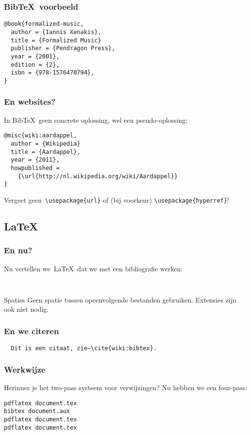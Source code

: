 \begin{frame}[fragile]
  \frametitle{Bib\TeX\ voorbeeld}

  \begin{verbatim}
@book{formalized-music,
  author = {Iannis Xenakis},
  title = {Formalized Music}
  publisher = {Pendragon Press},
  year = {2001},
  edition = {2},
  isbn = {978-1576470794},
}
  \end{verbatim}
\end{frame}

\begin{frame}[fragile]
  \frametitle{En websites?}

  In Bib\TeX\ geen concrete oplossing, wel een pseudo-oplossing:
  \begin{verbatim}
@misc{wiki:aardappel,
  author = {Wikipedia}
  title = {Aardappel},
  year = {2011},
  howpublished =
    {\url{http://nl.wikipedia.org/wiki/Aardappel}}
}
  \end{verbatim}
  Vergeet geen~\texttt{\textcolor{uagreen}{\textbackslash usepackage}\{url\}} of (bij voorkeur) \texttt{\textcolor{uagreen}{\textbackslash usepackage}\{hyperref\}}!
\end{frame}

\subsection{\LaTeX}
\begin{frame}[fragile]
  \frametitle{En nu?}

  Nu vertellen we~\LaTeX\ dat we met een bibliografie werken:
  \begin{verbatim}


  \end{verbatim}
  \begin{alertblock}{Spaties}
  Geen spatie tussen opeenvolgende bestanden gebruiken. Extensies zijn ook niet nodig.
  \end{alertblock}
\end{frame}

\begin{frame}[fragile]
  \frametitle{En we citeren}

  \begin{verbatim}
  Dit is een citaat, zie~\cite{wiki:bibtex}.
  \end{verbatim}
\end{frame}

\begin{frame}[fragile]
  \frametitle{Werkwijze}

  Herinner je het two-pass systeem voor verwijzingen? Nu hebben we een four-pass:
  \begin{verbatim}
pdflatex document.tex
bibtex document.aux
pdflatex document.tex
pdflatex document.tex\end{verbatim}
\end{frame}

